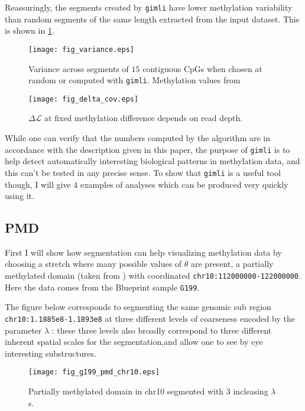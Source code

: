 \documentclass[12pt]{amsart}
\newcommand{\lik}{\ensuremath{\mathcal{L}}}
\newcommand{\gimli}{\texttt{gimli}}
\begin{document}
Reassuringly, the segments created by \gimli{} have lower methylation
variability than random segments of the same length extracted from the 
input dataset. 
This is shown in \ref{fig_variance}.

\begin{figure}\label{fig_variance}
\texttt{[image: fig\_variance.eps]}
\caption{Variance across segments of $15$ contiguous CpGs when chosen at 
random or 
computed with \gimli{}. Methylation values from }
\end{figure}

\begin{figure}\label{fig_delta_cov}
\texttt{[image: fig\_delta\_cov.eps]}
\caption{$\Delta  \lik$ at fixed methylation difference depends on read depth.}
\end{figure}

While one can verify that the numbers computed by the algorithm are in 
accordance with the description
given in this paper, the purpose of \gimli{} is to help 
detect automatically interesting biological patterns in methylation data, 
and this can't be tested in any 
precise sense. To show that \gimli{} is a useful tool
though, I will give $4$ examples of analyses which can be produced very quickly
using it. 

\subsection{PMD}

First I will show how segmentation can help visualizing methylation data by choosing
a stretch where many possible values of $\theta$ are present, a partially
methylated domain (taken from \cite{pmd}) with coordinated 
\texttt{chr10:112000000-122000000}. Here the data comes from the Blueprint sample \texttt{G199}. 

The figure below corresponds to segmenting the same genomic sub region \texttt{chr10:1.1885e8-1.1893e8} at 
three different levels of coarseness encoded by the parameter $\lambda$ : 
these three levels also broadly correspond to three different inherent spatial scales for the segmentation,and allow one to 
see by eye interesting substructures. 

\begin{figure}\label{fig_g199_pmd_chr10.eps}
\texttt{[image: fig\_g199\_pmd\_chr10.eps]}
\caption{Partially methylated domain in chr10 segmented with $3$ incleasing $\lambda$s.}
\end{figure}
\end{document}
